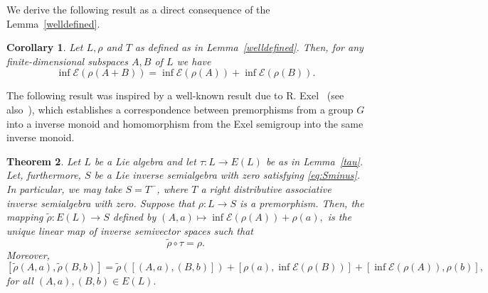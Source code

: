 \documentclass{amsart}
\newcommand{\E}{\mathcal{E}}
\newcommand{\0}{{\vartheta}}
\newtheorem{thm}{Theorem}[section]
\newtheorem{cor}[thm]{Corollary}
\theoremstyle{definition}
\theoremstyle{remark}
\numberwithin{equation}{section}
\newtheorem*{Theorem A}{\textbf{Theorem A}}
\newtheorem*{Corollary E}{\textbf{Corollary E}}
\newtheorem*{Corollary F}{\textbf{Corollary F}}
\newtheorem*{Theorem B}{\textbf{Theorem B}}
\newtheorem*{Theorem C}{\textbf{Theorem C}}
\newtheorem*{Theorem D}{\textbf{Theorem B}}
\newtheorem*{p a}{\textbf{Proof of  Theorem A}}
\newtheorem*{p b}{\textbf{Proof of Theorem B}}
\newtheorem*{p c}{\textbf{Proof of  Theorem C}}
\newtheorem*{p d}{\textbf{Proof of  Theorem D}}
\begin{document}
We derive the following result as a direct  consequence of the Lemma~\ref{welldefined}.

\begin{cor}\label{cor:infErho}
Let $L,\rho$ and $T$ as defined as in Lemma~\ref{welldefined}. Then, for any finite-dimensional subspaces  $A,B$  of $L$ we have 
$$\inf\E(\rho(A+B))=\inf\E(\rho(A))+\inf\E(\rho(B)).$$
\end{cor}

The following result was inspired by a well-known result due to R. Exel~\cite[Proposition 2.2]{Exel1998} (see also~\cite[Theorem 2.4]{KL}), which establishes  a correspondence between premorphisms from a group $G$ into a inverse monoid and homomorphism from the Exel semigroup into the same inverse monoid. 

\begin{thm}\label{prouniq}
Let $L$ be a Lie algebra and let $\tau:L \rightarrow E(L)$ be as in Lemma~\ref{tau}. Let, furthermore, $S$ be a Lie inverse semialgebra with zero satisfying \eqref{eq:Sminus}. In particular, we may take $S=T^{-}$, where $T$ a right distributive associative inverse semialgebra with zero.  Suppose that $\rho :L \rightarrow S$ is a premorphism. Then,  the mapping $\widetilde{\rho}:E(L) \rightarrow S$ defined by $(A,a)\mapsto \inf\E(\rho(A))+\rho (a),$ is the unique linear map of inverse semivector spaces such that
\begin{equation}\label{eq:unique}
\widetilde{\rho} \circ \tau =\rho .
\end{equation} Moreover,  
\begin{equation}\label{eq:moreover}
[\widetilde{\rho}(A,a),\widetilde{\rho}(B,b)]=\widetilde{\rho} ([(A,a),(B,b)]) +[\rho (a),\inf\E(\rho(B)) ]+ [\inf\E(\rho(A)), \rho(b)],
\end{equation}
 for all $(A,a),(B,b)\in E(L).$ 
\end{thm}
\end{document}
